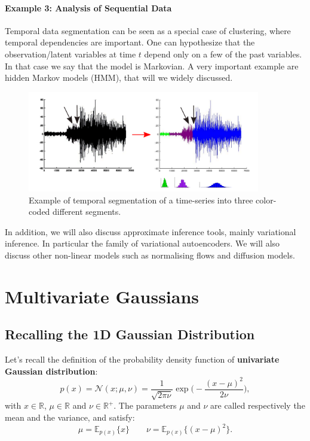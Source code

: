 \paragraph{Example 3: Analysis of Sequential Data} Temporal data segmentation can be seen as a special case of clustering, where temporal dependencies are important. One can hypothesize that the observation/latent variables at time $t$ depend only on a few of the past variables. In that case we say that the model is Markovian. A very important example are hidden Markov models (HMM), that will we widely discussed.
\begin{figure}[H]
\centering
\includegraphics[height=4.4cm]{fig/hmm.pdf}
\caption{Example of temporal segmentation of a time-series into three color-coded different segments.}
\end{figure}


In addition, we will also discuss approximate inference tools, mainly variational inference. In particular the family of variational autoencoders. We will also discuss other non-linear models such as normalising flows and diffusion models.



\section{Multivariate Gaussians}

\subsection{Recalling the 1D Gaussian Distribution}

Let's recall the definition of the probability density function of \textbf{univariate Gaussian distribution}:
\begin{equation}
p(x) = \mathcal{N}(x;\mu,\nu) = \frac{1}{\sqrt{2\pi\nu}}\exp\Big(-\frac{(x-\mu)^2}{2\nu}\Big), 
\end{equation}
with $x\in\mathbb{R}$, $\mu\in\mathbb{R}$ and $\nu\in\mathbb{R}^{+}$. The parameters $\mu$ and $\nu$ are called respectively the mean and the variance, and satisfy:
\begin{equation}
 \mu = \mathbb{E}_{p(x)}\{x\} \qquad \nu = \mathbb{E}_{p(x)}\{(x-\mu)^2\}.
\end{equation}

